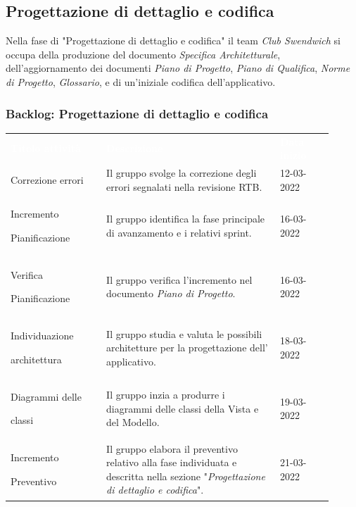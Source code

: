 \subsection{Progettazione di dettaglio e codifica}
Nella fase di "Progettazione di dettaglio e codifica" il team \textit{Club Swendwich} si occupa della produzione del documento \textit{Specifica Architetturale}, dell'aggiornamento dei documenti \textit{Piano di Progetto}, \textit{Piano di Qualifica}, \textit{Norme di Progetto}, \textit{Glossario}, e di un'iniziale codifica dell'applicativo.

\newpage
\subsubsection{Backlog: Progettazione di dettaglio e codifica}
{\renewcommand{\arraystretch}{1.5}
\begin{longtable}{p{0.27\linewidth}p{0.49\linewidth}p{0.15\linewidth}}
	\rowcolor[RGB]{33, 73, 50}
	\textcolor{white}{\textbf{Titolo attività}} & \textcolor{white}{\textbf{Descrizione}} & \textcolor{white}{\textbf{Data inizio}}\\

    \rowcolor[RGB]{216, 235, 171}
    Correzione errori & Il gruppo svolge la correzione degli errori segnalati nella revisione RTB. & 12-03-2022\\

    \rowcolor[RGB]{233, 245, 206}
    Incremento \par Pianificazione & Il gruppo identifica la fase principale di avanzamento e i relativi sprint. & 16-03-2022\\

    \rowcolor[RGB]{216, 235, 171} 
    Verifica \par Pianificazione & Il gruppo verifica l'incremento nel documento \textit{Piano di Progetto}. & 16-03-2022\\

    \rowcolor[RGB]{233, 245, 206}
    Individuazione \par architettura & Il gruppo studia e valuta le possibili architetture per la progettazione dell' applicativo. & 18-03-2022\\

    \rowcolor[RGB]{216, 235, 171}
    Diagrammi delle \par classi & Il gruppo inzia a produrre i diagrammi delle classi della Vista e del Modello. & 19-03-2022 \\

    \rowcolor[RGB]{233, 245, 206}
    Incremento \par Preventivo & Il gruppo elabora il preventivo relativo alla fase individuata e descritta nella sezione "\textit{Progettazione di dettaglio e codifica}". & 21-03-2022\\


\end{longtable}}
